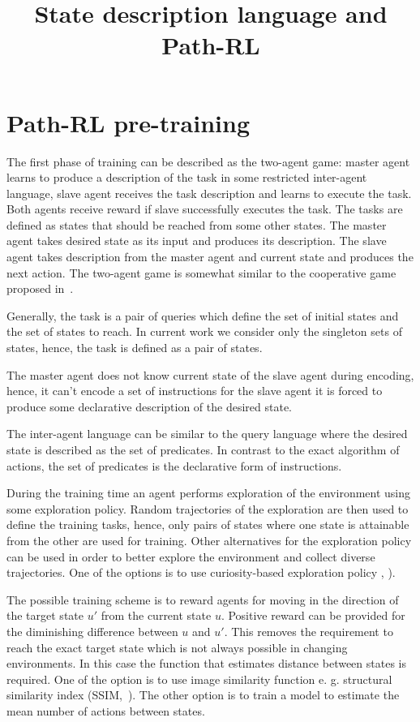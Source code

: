 \documentclass{article}
\title{State description language and Path-RL}
\author{}
\date{}
\begin{document}
\maketitle

\section{Path-RL pre-training}

The first phase of training can be described as the two-agent game: master agent learns to produce a description of the task in some restricted inter-agent language, slave agent receives the task description and learns to execute the task. Both agents receive reward if slave successfully executes the task. The tasks are defined as states that should be reached from some other states. The master agent takes desired state as its input and produces its description. The slave agent takes description from the master agent and current state and produces the next action. The two-agent game is somewhat similar to the cooperative game proposed in~\citep{Mordatch2018EmergenceOG}.

Generally, the task is a pair of queries which define the set of initial states and the set of states to reach. In current work we consider only the singleton sets of states, hence, the task is defined as a pair of states.

The master agent does not know current state of the slave agent during encoding, hence, it can't encode a set of instructions for the slave agent it is forced to produce some declarative description of the desired state.

The inter-agent language can be similar to the query language where the desired state is described as the set of predicates. In contrast to the exact algorithm of actions, the set of predicates is the declarative form of instructions.

During the training time an agent performs exploration of the environment using some exploration policy. Random trajectories of the exploration are then used to define the training tasks, hence, only pairs of states where one state is attainable from the other are used for training. Other alternatives for the exploration policy can be used in order to better explore the environment and collect diverse trajectories. One of the options is to use curiosity-based exploration policy \citep{Pathak2017CuriosityDrivenEB}, \citep{Burda2019ExplorationBR}).

The possible training scheme is to reward agents for moving in the direction of the target state $u'$ from the current state $u$. Positive reward can be provided for the diminishing difference between $u$ and $u'$. This removes the requirement to reach the exact target state which is not always possible in changing environments. In this case the function that estimates distance between states is required. One of the option is to use image similarity function e. g. structural similarity index (SSIM,~\citep{Wang2004ImageQA}). The other option is to train a model to estimate the mean number of actions between states.
\end{document}
